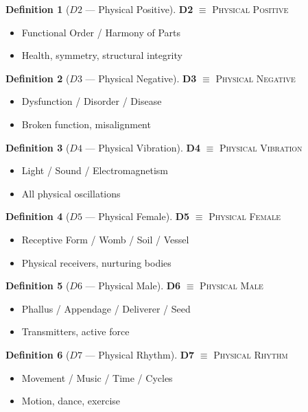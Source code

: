 \documentclass[11pt,twoside,openright]{book}
\theoremstyle{definition}
\newtheorem{definition}{Definition}[chapter]
\theoremstyle{plain}
\theoremstyle{remark}
\begin{document}
\begin{definition}[$D2$ --- Physical Positive]
\label{def:D2}
\textbf{D2} $\equiv$ \textsc{Physical Positive}
\begin{itemize}
  \item Functional Order / Harmony of Parts
  \item Health, symmetry, structural integrity
\end{itemize}
\end{definition}

\begin{definition}[$D3$ --- Physical Negative]
\label{def:D3}
\textbf{D3} $\equiv$ \textsc{Physical Negative}
\begin{itemize}
  \item Dysfunction / Disorder / Disease
  \item Broken function, misalignment
\end{itemize}
\end{definition}

\begin{definition}[$D4$ --- Physical Vibration]
\label{def:D4}
\textbf{D4} $\equiv$ \textsc{Physical Vibration}
\begin{itemize}
  \item Light / Sound / Electromagnetism
  \item All physical oscillations
\end{itemize}
\end{definition}

\begin{definition}[$D5$ --- Physical Female]
\label{def:D5}
\textbf{D5} $\equiv$ \textsc{Physical Female}
\begin{itemize}
  \item Receptive Form / Womb / Soil / Vessel
  \item Physical receivers, nurturing bodies
\end{itemize}
\end{definition}

\begin{definition}[$D6$ --- Physical Male]
\label{def:D6}
\textbf{D6} $\equiv$ \textsc{Physical Male}
\begin{itemize}
  \item Phallus / Appendage / Deliverer / Seed
  \item Transmitters, active force
\end{itemize}
\end{definition}

\begin{definition}[$D7$ --- Physical Rhythm]
\label{def:D7}
\textbf{D7} $\equiv$ \textsc{Physical Rhythm}
\begin{itemize}
  \item Movement / Music / Time / Cycles
  \item Motion, dance, exercise
\end{itemize}
\end{definition}
\end{document}
